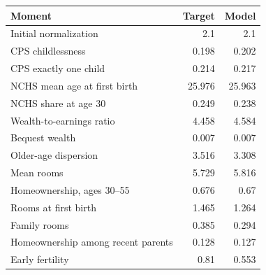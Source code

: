 \begingroup\small
\setlength{\tabcolsep}{3pt}
\renewcommand{\arraystretch}{1.04}
\begin{tabularx}{\linewidth}{Xrr}
\toprule
Moment & Target & Model \\
\midrule
Initial normalization & 2.1 & 2.1 \\
CPS childlessness & 0.198 & 0.202 \\
CPS exactly one child & 0.214 & 0.217 \\
NCHS mean age at first birth & 25.976 & 25.963 \\
NCHS share at age 30 & 0.249 & 0.238 \\
Wealth-to-earnings ratio & 4.458 & 4.584 \\
Bequest wealth & 0.007 & 0.007 \\
Older-age dispersion & 3.516 & 3.308 \\
Mean rooms & 5.729 & 5.816 \\
Homeownership, ages 30--55 & 0.676 & 0.67 \\
Rooms at first birth & 1.465 & 1.264 \\
Family rooms & 0.385 & 0.294 \\
Homeownership among recent parents & 0.128 & 0.127 \\
Early fertility & 0.81 & 0.553 \\
\bottomrule
\end{tabularx}
\endgroup
